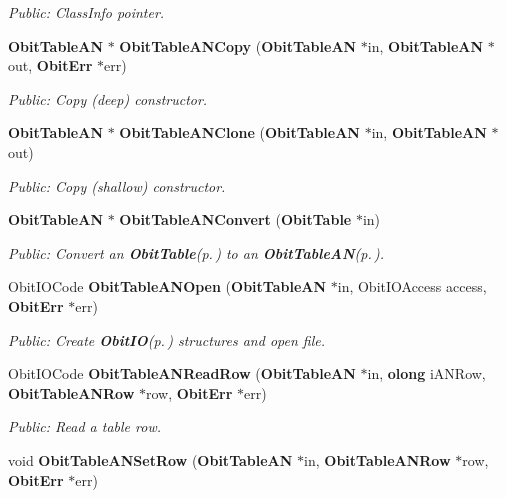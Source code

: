\begin{CompactItemize}
\begin{CompactList}\small\item\em Public: Class\-Info pointer. \item\end{CompactList}\item 
{\bf Obit\-Table\-AN} $\ast$ {\bf Obit\-Table\-ANCopy} ({\bf Obit\-Table\-AN} $\ast$in, {\bf Obit\-Table\-AN} $\ast$out, {\bf Obit\-Err} $\ast$err)
\begin{CompactList}\small\item\em Public: Copy (deep) constructor. \item\end{CompactList}\item 
{\bf Obit\-Table\-AN} $\ast$ {\bf Obit\-Table\-ANClone} ({\bf Obit\-Table\-AN} $\ast$in, {\bf Obit\-Table\-AN} $\ast$out)
\begin{CompactList}\small\item\em Public: Copy (shallow) constructor. \item\end{CompactList}\item 
{\bf Obit\-Table\-AN} $\ast$ {\bf Obit\-Table\-ANConvert} ({\bf Obit\-Table} $\ast$in)
\begin{CompactList}\small\item\em Public: Convert an {\bf Obit\-Table}{\rm (p.\,\pageref{structObitTable})} to an {\bf Obit\-Table\-AN}{\rm (p.\,\pageref{structObitTableAN})}. \item\end{CompactList}\item 
Obit\-IOCode {\bf Obit\-Table\-ANOpen} ({\bf Obit\-Table\-AN} $\ast$in, Obit\-IOAccess access, {\bf Obit\-Err} $\ast$err)
\begin{CompactList}\small\item\em Public: Create {\bf Obit\-IO}{\rm (p.\,\pageref{structObitIO})} structures and open file. \item\end{CompactList}\item 
Obit\-IOCode {\bf Obit\-Table\-ANRead\-Row} ({\bf Obit\-Table\-AN} $\ast$in, {\bf olong} i\-ANRow, {\bf Obit\-Table\-ANRow} $\ast$row, {\bf Obit\-Err} $\ast$err)
\begin{CompactList}\small\item\em Public: Read a table row. \item\end{CompactList}\item 
void {\bf Obit\-Table\-ANSet\-Row} ({\bf Obit\-Table\-AN} $\ast$in, {\bf Obit\-Table\-ANRow} $\ast$row, {\bf Obit\-Err} $\ast$err)

\end{CompactItemize}
